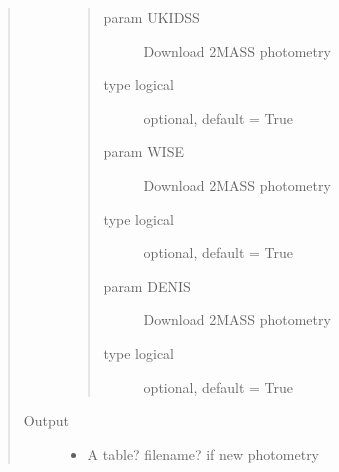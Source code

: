 \documentclass[letterpaper,10pt,english]{sphinxmanual}
\begin{document}
\begin{fulllineitems}
\begin{quote}
\begin{description}
\begin{quote}
\begin{description}
\item[{param UKIDSS}] \leavevmode
Download 2MASS photometry

\item[{type logical}] \leavevmode
optional, default = True

\item[{param WISE}] \leavevmode
Download 2MASS photometry

\item[{type logical}] \leavevmode
optional, default = True

\item[{param DENIS}] \leavevmode
Download 2MASS photometry

\item[{type logical}] \leavevmode
optional, default = True

\end{description}\end{quote}

\item[{Output}] \leavevmode\begin{itemize}
\item {} 
A table? filename? if new photometry

\end{itemize}

\end{description}\end{quote}

\end{fulllineitems}

\end{document}
